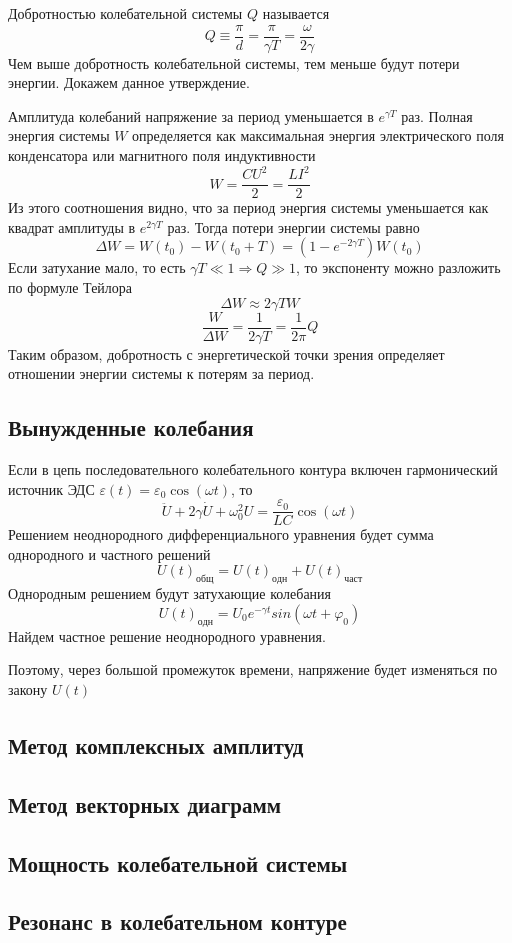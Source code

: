 Добротностью колебательной системы $Q$ называется
$$
Q \equiv \frac{\pi}{d} = \frac{\pi}{\gamma T} = \frac{\omega}{2 \gamma}
$$ 
Чем выше добротность колебательной системы, тем меньше будут потери энергии. Докажем данное утверждение.

Амплитуда колебаний напряжение за период уменьшается в $e^{\gamma T}$ раз. Полная энергия системы $W$ определяется как максимальная энергия электрического поля конденсатора или магнитного поля индуктивности
$$
W = \frac{CU^2}{2} = \frac{LI^2}{2}
$$
Из этого соотношения видно, что за период энергия системы уменьшается как квадрат амплитуды в $e^{2\gamma T}$ раз.
Тогда потери энергии системы равно
$$
\Delta W = W(t_0) - W(t_0 + T) = (1 - e^{-2\gamma T}) W(t_0)
$$
Если затухание мало, то есть $\gamma T \ll 1 \Rightarrow Q \gg 1$, то экспоненту можно разложить по формуле Тейлора
$$
\Delta W \approx 2 \gamma T W
$$
$$
\frac{W}{\Delta W} = \frac{1}{2\gamma T} = \frac{1}{2\pi}Q
$$
Таким образом, добротность с энергетической точки зрения определяет отношении энергии системы к потерям за период.

\subsection*{Вынужденные колебания}

Если в цепь последовательного колебательного контура включен гармонический источник ЭДС $\varepsilon(t) = \varepsilon_0 \cos{(\omega t)}$, то
$$
\ddot{U} + 2\gamma \dot{U} + \omega_0^2 U = \frac{\varepsilon_0}{LC} \cos{(\omega t)}
$$
Решением неоднородного дифференциального уравнения будет сумма однородного и частного решений
$$
U(t)_{общ} = U(t)_{одн} + U(t)_{част}
$$
Однородным решением будут затухающие колебания
$$
U(t)_{одн} = U_0 e^{-\gamma t} sin(\omega t + \varphi_0)
$$
Найдем частное решение неоднородного уравнения.

Поэтому, через большой промежуток времени, напряжение будет изменяться по закону $U(t)_{}$

\subsection*{Метод комплексных амплитуд}

\subsection*{Метод векторных диаграмм}

\subsection*{Мощность колебательной системы}

\subsection*{Резонанс в колебательном контуре}

